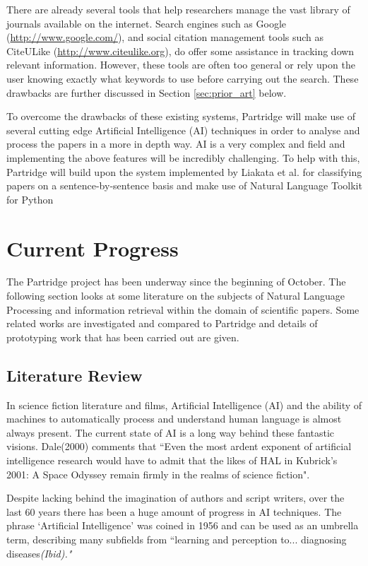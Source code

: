 \documentclass[12pt,a4paper]{article}
\begin{document}
There are already several tools that help researchers manage the vast library
of journals available on the internet. Search engines such as Google
({\url{http://www.google.com/}}), and social citation management tools such as
CiteULike ({\url{http://www.citeulike.org}}), do offer some assistance in
tracking down relevant information. However, these tools are often too general
or rely upon the user knowing exactly what keywords to use before carrying out
the search. These drawbacks are further discussed in Section
\ref{sec:prior_art} below.

To overcome the drawbacks of these existing systems, Partridge will make use of
several cutting edge Artificial Intelligence (AI) techniques in order to analyse and
process the papers in a more in depth way. AI is a very complex and field and
implementing the above features will be incredibly challenging. To help with
this, Partridge will build upon the system implemented by Liakata et al. for
classifying papers on a sentence-by-sentence basis\cite{citeulike:10444769} and
make use of Natural Language Toolkit for Python
\cite{Bird:2006:NNL:1225403.1225421} 

\section{Current Progress}

The Partridge project has been underway since the beginning of October. The
following section looks at some literature on the subjects of Natural Language
Processing and information retrieval within the domain of scientific papers.
Some related works are investigated and compared to Partridge and details of
prototyping work that has been carried out are given.

\subsection{Literature Review}

In science fiction literature and films, Artificial Intelligence (AI) and the
ability of machines to automatically process and understand human language is
almost always present. The current state of AI is a long way behind these
fantastic visions. Dale(2000) comments that ``Even the most ardent exponent of
artificial intelligence research would have to admit that the likes of HAL in
Kubrick's 2001: A Space Odyssey remain firmly in the realms of science
fiction\cite{dale2000handbook}".

Despite lacking behind the imagination of authors and script writers, over the last 60 years there
has been a huge amount of progress in AI techniques. The phrase `Artificial
Intelligence' was coined in 1956\cite{russell2010artificial} and can be used as
an umbrella term, describing many subfields from ``learning and perception
to... diagnosing diseases\it{(Ibid)}."
\end{document}
